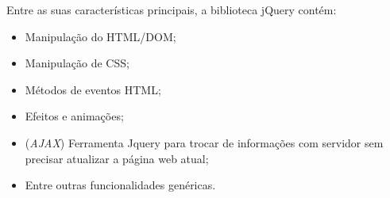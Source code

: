         Entre as suas características principais, a biblioteca jQuery contém:

        \begin{itemize}
            \item Manipulação do HTML/DOM;
            \item Manipulação de CSS;
            \item Métodos de eventos HTML;
            \item Efeitos e animações;
            \item (\emph{AJAX}) Ferramenta Jquery para trocar de informações com servidor sem precisar atualizar a página web atual;
            \item Entre outras funcionalidades genéricas.
        \end{itemize}
